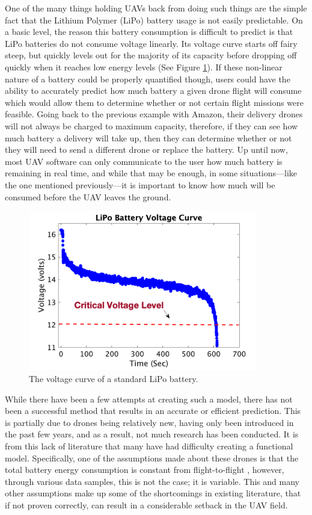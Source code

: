 \documentclass{article}
\begin{document}
One of the many things holding UAVs back from doing such things are the simple fact that the Lithium Polymer (LiPo) battery usage is not easily predictable. On a basic level, the reason this battery consumption is difficult to predict is that LiPo batteries do not consume voltage linearly. Its voltage curve starts off fairy steep, but quickly levels out for the majority of its capacity before dropping off quickly when it reaches low energy levels (See Figure \ref{fig:volt}). If these non-linear nature of a battery could be properly quantified though, users could have the ability to accurately predict how much battery a given drone flight will consume which would allow them to determine whether or not certain flight missions were feasible. Going back to the previous example with Amazon, their delivery drones will not always be charged to maximum capacity, therefore, if they can see how much battery a delivery will take up, then they can determine whether or not they will need to send a different drone or replace the battery. Up until now, most UAV software can only communicate to the user how much battery is remaining in real time, and while that may be enough, in some situations—like the one mentioned previously—it is important to know how much will be consumed before the UAV leaves the ground.\par

\begin{figure}[!h]
	\centering
	\includegraphics[width = 100mm]{images/voltage.png}
	\caption{The voltage curve of a standard LiPo battery.}
	\label{fig:volt}
\end{figure}

While there have been a few attempts at creating such a model, there has not been a successful method that results in an accurate or efficient prediction. This is partially due to drones being relatively new, having only been introduced in the past few years, and as a result, not much research has been conducted. It is from this lack of literature that many have had difficulty creating a functional model. Specifically, one of the assumptions made about these drones is that the total battery energy consumption is constant from flight-to-flight \cite{Prasetia}, however, through various data samples, this is not the case; it is variable. This and many other assumptions make up some of the shortcomings in existing literature, that if not proven correctly, can result in a considerable setback in the UAV field. 
\end{document}

